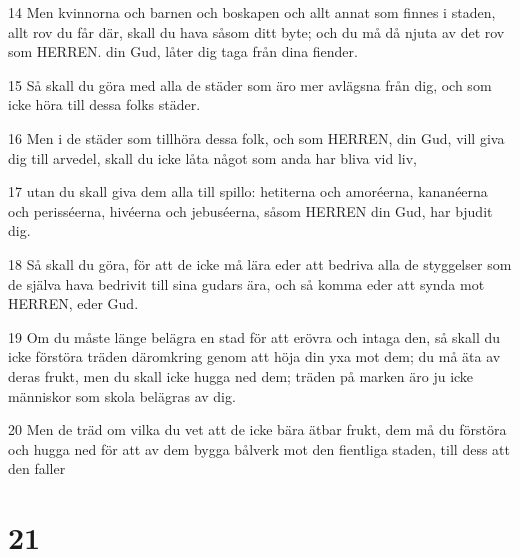\par 14 Men kvinnorna och barnen och boskapen och allt annat som finnes i staden, allt rov du får där, skall du hava såsom ditt byte; och du må då njuta av det rov som HERREN. din Gud, låter dig taga från dina fiender.
\par 15 Så skall du göra med alla de städer som äro mer avlägsna från dig, och som icke höra till dessa folks städer.
\par 16 Men i de städer som tillhöra dessa folk, och som HERREN, din Gud, vill giva dig till arvedel, skall du icke låta något som anda har bliva vid liv,
\par 17 utan du skall giva dem alla till spillo: hetiterna och amoréerna, kananéerna och perisséerna, hivéerna och jebuséerna, såsom HERREN din Gud, har bjudit dig.
\par 18 Så skall du göra, för att de icke må lära eder att bedriva alla de styggelser som de själva hava bedrivit till sina gudars ära, och så komma eder att synda mot HERREN, eder Gud.
\par 19 Om du måste länge belägra en stad för att erövra och intaga den, så skall du icke förstöra träden däromkring genom att höja din yxa mot dem; du må äta av deras frukt, men du skall icke hugga ned dem; träden på marken äro ju icke människor som skola belägras av dig.
\par 20 Men de träd om vilka du vet att de icke bära ätbar frukt, dem må du förstöra och hugga ned för att av dem bygga bålverk mot den fientliga staden, till dess att den faller

\chapter{21}

